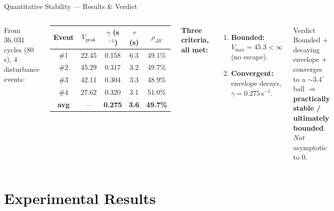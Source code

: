 \documentclass[10pt]{beamer}
\begin{document}
 
\begin{frame}{Quantitative Stability — Results \& Verdict}
  \begin{columns}[T,onlytextwidth]
    \footnotesize
    From $36{,}031$ cycles (80\,s), 4 disturbance events:
    \begin{center}
    \scriptsize
    \begin{tabular}{ccccc}
    \toprule
    Event & $V_{\text{peak}}$ & $\gamma$ (s$^{-1}$) & $\tau$ (s) & $\rho_{\Delta V}$ \\
    \midrule
    \#1 & 22.45 & 0.158 & 6.3 & 49.1\% \\
    \#2 & 45.29 & 0.317 & 3.2 & 49.7\% \\
    \#3 & 42.11 & 0.304 & 3.3 & 48.9\% \\
    \#4 & 27.62 & 0.320 & 3.1 & 51.0\% \\
    \midrule
    \textbf{avg} & — & \textbf{0.275} & \textbf{3.6} & \textbf{49.7\%} \\
    \bottomrule
    \end{tabular}
    \end{center}
 
    \scriptsize
    \textbf{Three criteria, all met:}
    \begin{enumerate}
      \item \textbf{Bounded:} $V_{\max}=45.3<\infty$ (no escape).
      \item \textbf{Convergent:} envelope decays, $\gamma=0.275\,\text{s}^{-1}$.
    \end{enumerate}
 
    \begin{exampleblock}{Verdict}
      \footnotesize
      Bounded $+$ decaying envelope $+$ converges to a $\sim\!3.4^\circ$ ball
      $\Rightarrow$ \textbf{practically stable / ultimately bounded}.
      \emph{Not} asymptotic to $0$.
    \end{exampleblock}
  \end{columns}
\end{frame}
 
\section{Experimental Results}
 
\end{document}
